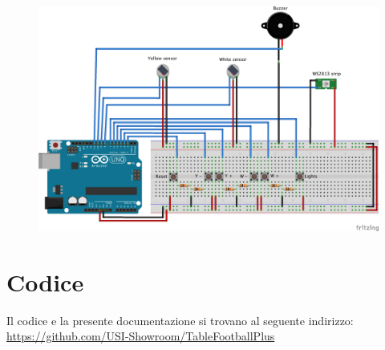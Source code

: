 \documentclass[12pt]{article}
\begin{document}
	\begin{figure}[H]
                \includegraphics[width=\textwidth]{img/circuit.png}
        \end{figure}
	


\section{Codice}

	Il codice e la presente documentazione si trovano al seguente indirizzo: \url{https://github.com/USI-Showroom/TableFootballPlus}
\end{document}
